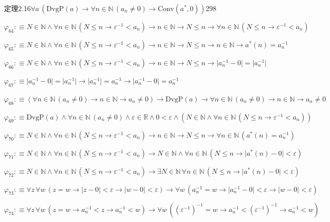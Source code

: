 \begin{fullproof}{定理2.16}{$\forall a\,(\mathrm{DvgP}(a) \to \forall n \in \mathbb{N}\,(a_{n} \neq 0) \to \mathrm{Conv}(a^{\ast},0))$}{298}
\begin{abbrevlist}
\item $\varphi_{64} :\equiv N \in \mathbb{N} \land \forall n \in \mathbb{N}\,(N \leq n \to \varepsilon^{-1} < a_{n}) \to n \in \mathbb{N} \to N \leq n \to \forall n \in \mathbb{N}\,(N \leq n \to \varepsilon^{-1} < a_{n})$
\item $\varphi_{65} :\equiv N \in \mathbb{N} \land \forall n \in \mathbb{N}\,(N \leq n \to \varepsilon^{-1} < a_{n}) \to n \in \mathbb{N} \to N \leq n \to n \in \mathbb{N} \to a^{\ast}(n) = a_{n}^{-1}$
\item $\varphi_{66} :\equiv N \in \mathbb{N} \land \forall n \in \mathbb{N}\,(N \leq n \to \varepsilon^{-1} < a_{n}) \to n \in \mathbb{N} \to N \leq n \to \lvert a_{n}^{-1} - 0 \rvert = \lvert a_{n}^{-1} \rvert$
\item $\varphi_{67} :\equiv \lvert a_{n}^{-1} - 0 \rvert = \lvert a_{n}^{-1} \rvert \to \lvert a_{n}^{-1} \rvert = a_{n}^{-1} \to \lvert a_{n}^{-1} - 0 \rvert = a_{n}^{-1}$
\item $\varphi_{68} :\equiv (\forall n \in \mathbb{N}\,(a_{n} \neq 0) \to n \in \mathbb{N} \to a_{n} \neq 0) \to \mathrm{DvgP}(a) \to \forall n \in \mathbb{N}\,(a_{n} \neq 0) \to n \in \mathbb{N} \to a_{n} \neq 0$
\item $\varphi_{69} :\equiv \mathrm{DvgP}(a) \land \forall n \in \mathbb{N}\,(a_{n} \neq 0) \land \varepsilon \in \mathbb{R} \land 0 < \varepsilon \land (N \in \mathbb{N} \land \forall n \in \mathbb{N}\,(N \leq n \to \varepsilon^{-1} < a_{n}))$
\item $\varphi_{70} :\equiv N \in \mathbb{N} \land \forall n \in \mathbb{N}\,(N \leq n \to \varepsilon^{-1} < a_{n}) \to n \in \mathbb{N} \to N \leq n \to \forall n \in \mathbb{N}\,(a^{\ast}(n) = a_{n}^{-1})$
\item $\varphi_{71} :\equiv N \in \mathbb{N} \land \forall n \in \mathbb{N}\,(N \leq n \to \varepsilon^{-1} < a_{n}) \to N \in \mathbb{N} \land \forall n \in \mathbb{N}\,(N \leq n \to \lvert a^{\ast}(n) - 0 \rvert < \varepsilon)$
\item $\varphi_{72} :\equiv N \in \mathbb{N} \land \forall n \in \mathbb{N}\,(N \leq n \to \varepsilon^{-1} < a_{n}) \to \exists N \in \mathbb{N}\,\forall n \in \mathbb{N}\,(N \leq n \to \lvert a^{\ast}(n) - 0 \rvert < \varepsilon)$
\item $\varphi_{73} :\equiv \forall z\,\forall w\,(z = w \to \lvert z - 0 \rvert < \varepsilon \to \lvert w - 0 \rvert < \varepsilon) \to \forall w\,(a_{n}^{-1} = w \to \lvert a_{n}^{-1} - 0 \rvert < \varepsilon \to \lvert w - 0 \rvert < \varepsilon)$
\item $\varphi_{74} :\equiv \forall z\,\forall w\,(z = w \to a_{n}^{-1} < z \to a_{n}^{-1} < w) \to \forall w\,((\varepsilon^{-1})^{-1} = w \to a_{n}^{-1} < (\varepsilon^{-1})^{-1} \to a_{n}^{-1} < w)$

\end{abbrevlist}
\end{fullproof}
